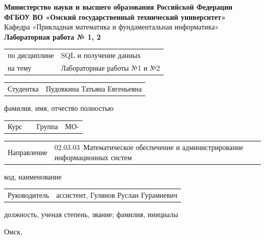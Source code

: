 \documentclass[14pt,a4paper]{extarticle}
\newcommand{\studentfullname}{Пудовкина Татьяна Евгеньевна}
\newcommand{\studentgroup}{МО-\underline{\hspace{1.3cm}}}
\newcommand{\studentcourse}{\underline{\hspace{1.3cm}}}
\newcommand{\disciplinename}{SQL и получение данных}
\newcommand{\reporttheme}{Лабораторные работы №1 и №2}
\newcommand{\supervisorname}{Гулянов Руслан Гурамиевич}
\newcommand{\supervisorpost}{ассистент}
\newcommand{\directioncode}{02.03.03}
\newcommand{\directionname}{Математическое обеспечение и администрирование информационных систем}
\begin{document}
\begin{titlepage}
    \begin{center}
        \textbf{Министерство науки и высшего образования Российской Федерации}\\
        \textbf{ФГБОУ ВО «Омский государственный технический университет»}\\
        \vspace{1.2cm}
        Кафедра «Прикладная математика и фундаментальная информатика»\\
        \vspace{1.5cm}
        \textbf{\Large Лабораторная работа № 1, 2}\\
        \vspace{0.8cm}
    \end{center}

    \renewcommand{\arraystretch}{1.35}
    \begin{tabularx}{\textwidth}{@{}lX@{}}
        по дисциплине & \disciplinename \\
        на тему & \reporttheme \\
    \end{tabularx}

    \vspace{1.4cm}

    \begin{tabularx}{\textwidth}{@{}lX@{}}
        Студентка & \studentfullname \\
    \end{tabularx}
    {\footnotesize фамилия, имя, отчество полностью}

    \vspace{0.7cm}

    \begin{tabularx}{\textwidth}{@{}lXlX@{}}
        Курс & \studentcourse & Группа & \studentgroup \\
    \end{tabularx}

    \vspace{0.7cm}

    \begin{tabularx}{\textwidth}{@{}lX@{}}
        Направление & \directioncode\ \directionname \\
    \end{tabularx}
    {\footnotesize код, наименование}

    \vspace{0.9cm}

    \begin{tabularx}{\textwidth}{@{}lX@{}}
        Руководитель & \supervisorpost, \supervisorname \\
    \end{tabularx}
    {\footnotesize должность, ученая степень, звание; фамилия, инициалы}

    \vfill

    \begin{center}
        Омск, \the\year
    \end{center}
\end{titlepage}
\end{document}
